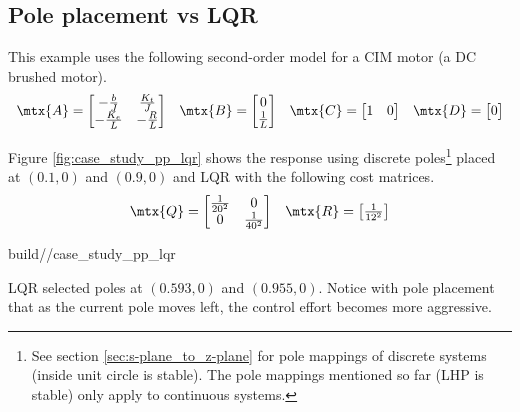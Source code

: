 \subsection{Pole placement vs LQR}

This example uses the following second-order \gls{model} for a CIM motor (a DC
brushed motor).
\begin{align*}
  \begin{array}{cccc}
    \mtx{A} = \begin{bmatrix}
      -\frac{b}{J} & \frac{K_t}{J} \\
      -\frac{K_e}{L} & -\frac{R}{L}
    \end{bmatrix} &
    \mtx{B} = \begin{bmatrix}
      0 \\
      \frac{1}{L}
    \end{bmatrix} &
    \mtx{C} = \begin{bmatrix}
      1 & 0
    \end{bmatrix} &
    \mtx{D} = \begin{bmatrix}
      0
    \end{bmatrix}
  \end{array}
\end{align*}

Figure \ref{fig:case_study_pp_lqr} shows the response using discrete
poles\footnote{See section \ref{sec:s-plane_to_z-plane} for pole mappings of
discrete systems (inside unit circle is stable). The pole mappings mentioned so
far (LHP is stable) only apply to continuous systems.} placed at $(0.1, 0)$ and
$(0.9, 0)$ and LQR with the following cost matrices.
\begin{align*}
  \begin{array}{cc}
    \mtx{Q} = \begin{bmatrix}
      \frac{1}{20^2} & 0 \\
      0 & \frac{1}{40^2}
    \end{bmatrix} &
    \mtx{R} = \begin{bmatrix}
      \frac{1}{12^2}
    \end{bmatrix}
  \end{array}
\end{align*}
\begin{svg}{build/\chapterpath/case_study_pp_lqr}
  \caption{Second-order CIM motor response with pole placement and LQR}
  \label{fig:case_study_pp_lqr}
\end{svg}

LQR selected poles at $(0.593, 0)$ and $(0.955, 0)$. Notice with pole placement
that as the current pole moves left, the \gls{control effort} becomes more
aggressive.
